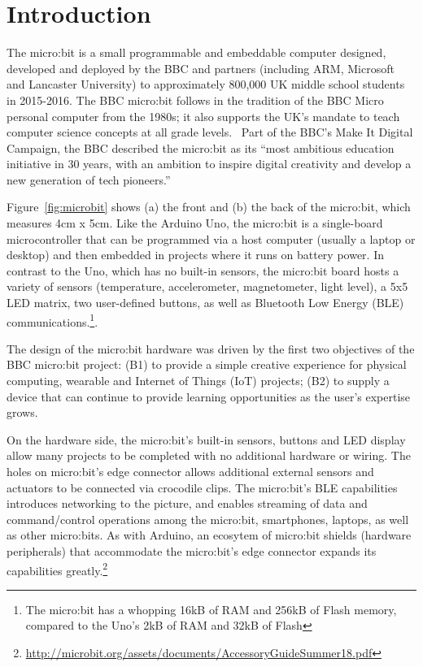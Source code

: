\section{Introduction}
\label{sec:intrp}


The micro:bit is a small programmable and embeddable computer designed, 
developed and deployed by the BBC and partners (including ARM, Microsoft
and Lancaster University) to approximately 800,000 UK middle school students
in 2015-2016. The BBC micro:bit follows in the tradition of the BBC Micro personal
computer from the 1980s; it also supports the UK's mandate to 
teach computer science concepts at all grade levels.~\cite{PeytonJones2013ICFP}
Part of the BBC's Make It Digital Campaign, the BBC described the
micro:bit as its ``most ambitious education initiative in 30 years, 
with an ambition to inspire digital creativity and 
develop a new generation of tech pioneers.''~\cite{BBCwebsite}


Figure~\ref{fig:microbit} shows (a) the front and (b) the back of the
micro:bit, which measures 4cm x 5cm. Like the Arduino Uno, 
the micro:bit is a single-board microcontroller 
that can be programmed via a host computer (usually a laptop or desktop)
and then embedded in projects where it runs on battery power.
In contrast to the Uno, which has no built-in sensors, the micro:bit 
board hosts a variety of sensors (temperature, accelerometer, magnetometer, 
light level), 
a 5x5 LED matrix, two user-defined buttons, as well as Bluetooth
Low Energy (BLE) communications.\footnote{The micro:bit has a whopping
16kB of RAM and 256kB of Flash memory, compared to the Uno's 2kB of 
RAM and 32kB of Flash}.

The design of the micro:bit hardware was driven by the
first two objectives of the BBC micro:bit project:
(B1) to provide a simple creative experience for physical computing, wearable and Internet of Things (IoT) projects;
(B2) to supply a device that can continue to provide learning opportunities as the user's expertise grows.

On the hardware side, the micro:bit's built-in sensors, buttons and LED display 
allow many projects to be completed with no additional hardware or wiring. 
The holes on micro:bit's edge
connector allows additional external sensors and actuators to be connected via crocodile clips.
The micro:bit's BLE capabilities introduces networking to the
picture, and enables streaming of data and command/control operations among the micro:bit, 
smartphones, laptops, as well as other micro:bits.
As with Arduino, an ecosytem of micro:bit shields
(hardware peripherals) that accommodate the micro:bit's edge
connector expands its capabilities greatly.\footnote{
\url{http://microbit.org/assets/documents/AccessoryGuideSummer18.pdf}
}

